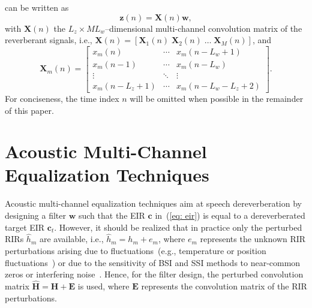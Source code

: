 \documentclass[10pt]{IEEEtran}
\begin{document}
can be written as
\begin{equation}
\label{eq: td_vec}
\mathbf{z}(n) = \mathbf{X}(n)\mathbf{w},
\end{equation}
with $\mathbf{X}(n)$ the $L_z \times ML_w$--dimensional multi-channel convolution matrix of the reverberant signals, i.e.,  $ \mathbf{X}(n) = [\mathbf{X}_1(n) \; \mathbf{X}_2(n) \; \ldots \; \mathbf{X}_M(n)]$, and %
\begin{equation}
\mathbf{X}_m(n) = \begin{bmatrix}
    x_m(n) &   \cdots & x_m(n-L_w+ 1) \\
    x_m(n-1) & \cdots & x_m(n-L_w) \\
    \vdots & \ddots & \vdots \\
    x_m(n-L_z+1) & \cdots & x_m(n-L_w-L_z+2)
   \end{bmatrix}.
 \end{equation} %
For conciseness, the time index $n$ will be omitted when possible in the remainder of this paper.

\section{Acoustic Multi-Channel Equalization Techniques}
\label{sec: ame}
Acoustic multi-channel equalization techniques aim at speech dereverberation by designing a filter $\mathbf{w}$ such that the EIR $\mathbf{c}$ in~(\ref{eq: eir}) is equal to a dereverberated target EIR $\mathbf{c}_t$.
However, it should be realized that in practice only the perturbed RIRs $\hat{h}_m$ are available, i.e., $\hat{h}_m = h_m + e_m$, where $e_m$ represents the unknown RIR perturbations arising due to fluctuations~(e.g., temperature or position fluctuations~\cite{Radlovic_ITSA_2000}) or due to the sensitivity of BSI and SSI methods to near-common zeros or interfering noise~\cite{Khong_ICASSP_2008,Haque_SPL_2008,Hu_EUSIPCO_2015}.
Hence, for the filter design, the perturbed convolution matrix $\hat{\mathbf{H}} = \mathbf{H} + \mathbf{E}$ is used, where $\mathbf{E}$ represents the convolution matrix of the RIR perturbations.
\end{document}
